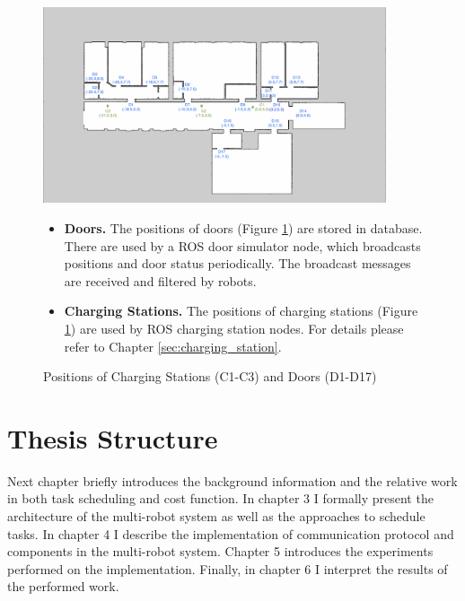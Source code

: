 \begin{figure}[htbp]
	\centering
	\includegraphics[width = 0.9\textwidth]{content/images/ch3/positions_door_station.png}
	\caption{Positions of Charging Stations (C1-C3) and Doors (D1-D17)}
    \label{fig:positions_door_station}
    \begin{itemize}
        \item \textbf{Doors.} The positions of doors (Figure \ref{fig:positions_door_station}) are stored in database. There are used by a ROS door simulator node, which broadcasts positions and door status periodically. The broadcast messages are received and filtered by robots.
        \item \textbf{Charging Stations.} The positions of charging stations (Figure \ref{fig:positions_door_station}) are used by ROS charging station nodes. For details please refer to Chapter \ref{sec:charging_station}.
    \end{itemize}
\end{figure}


\section{Thesis Structure}
Next chapter briefly introduces the background information and the relative work in both task scheduling and cost function.
In chapter 3 I formally present the architecture of the multi-robot system as well as the approaches to schedule tasks. 
In chapter 4 I describe the implementation of communication protocol and components in the multi-robot system.
Chapter 5 introduces the experiments performed on the implementation. 
Finally, in chapter 6 I interpret the results of the performed work.